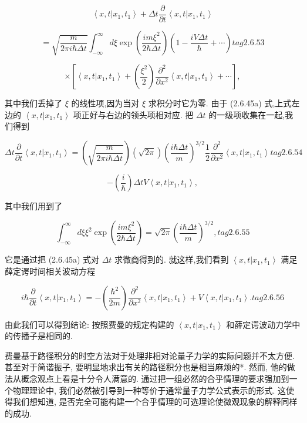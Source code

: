 \documentclass[lang=cn,newtx,10pt,scheme=chinese,thmcnt=section]{elegantbook}
\begin{document}
$$
\left\langle {x, t | {x}_{1},{t}_{1}}\right\rangle + {\Delta t}\frac{\partial }{\partial t}\left\langle {x, t | {x}_{1},{t}_{1}}\right\rangle
$$

$$
= \sqrt{\frac{m}{{2\pi i}\hbar {\Delta t}}}{\int }_{-\infty }^{\infty }{d\xi }\exp \left( \frac{{im}{\xi }^{2}}{2\hbar {\Delta t}}\right) \left( {1 - \frac{iV\Delta t}{\hbar } + \cdots }\right) tag{2. 6.53}
$$

$$
\times \left\lbrack {\left\langle {x, t | {x}_{1},{t}_{1}}\right\rangle + \left( \frac{{\xi }^{2}}{2}\right) \frac{{\partial }^{2}}{\partial {x}^{2}}\left\langle {x, t | {x}_{1},{t}_{1}}\right\rangle + \cdots }\right\rbrack ,
$$

其中我们丢掉了 $\xi$ 的线性项,因为当对 $\xi$ 求积分时它为零. 由于 (2.6.45a) 式,上式左边的 $\left\langle {x, t | {x}_{1},{t}_{1}}\right\rangle$ 项正好与右边的领头项相对应. 把 ${\Delta t}$ 的一级项收集在一起,我们得到

$$
{\Delta t}\frac{\partial }{\partial t}\left\langle {x, t | {x}_{1},{t}_{1}}\right\rangle = \left( \sqrt{\frac{m}{{2\pi i}\hbar {\Delta t}}}\right) \left( \sqrt{2\pi }\right) {\left( \frac{i\hbar {\Delta t}}{m}\right) }^{3/2}\frac{1}{2}\frac{{\partial }^{2}}{\partial {x}^{2}}\left\langle {x, t | {x}_{1},{t}_{1}}\right\rangle tag{2. 6.54}
$$

$$
- \left( \frac{i}{\hbar }\right) {\Delta tV}\left\langle {x, t | {x}_{1},{t}_{1}}\right\rangle ,
$$

其中我们用到了

$$
{\int }_{-\infty }^{\infty }{d\xi }{\xi }^{2}\exp \left( \frac{{im}{\xi }^{2}}{2\hbar {\Delta t}}\right) = \sqrt{2\pi }{\left( \frac{i\hbar {\Delta t}}{m}\right) }^{3/2}, tag{2.6.55}
$$

它是通过把 (2.6.45a) 式对 ${\Delta t}$ 求微商得到的. 就这样,我们看到 $\left\langle {x, t | {x}_{1},{t}_{1}}\right\rangle$ 满足薛定谔时间相关波动方程

$$
i\hbar \frac{\partial }{\partial t}\left\langle {x, t | {x}_{1},{t}_{1}}\right\rangle = - \left( \frac{{\hbar }^{2}}{2m}\right) \frac{{\partial }^{2}}{\partial {x}^{2}}\left\langle {x, t | {x}_{1},{t}_{1}}\right\rangle + V\left\langle {x, t | {x}_{1},{t}_{1}}\right\rangle . tag{2.6.56}
$$

由此我们可以得到结论: 按照费曼的规定构建的 $\left\langle {x, t | {x}_{1},{t}_{1}}\right\rangle$ 和薛定谔波动力学中的传播子是相同的.

费曼基于路径积分的时空方法对于处理非相对论量子力学的实际问题并不太方便. 甚至对于简谐振子, 要明显地求出有关的路径积分也是相当麻烦的*. 然而, 他的做法从概念观点上看是十分令人满意的. 通过把一组必然的合乎情理的要求强加到一个物理理论中, 我们必然被引导到一种等价于通常量子力学公式表示的形式. 这使得我们想知道, 是否完全可能构建一个合乎情理的可选理论使微观现象的解释同样的成功.
\end{document}
